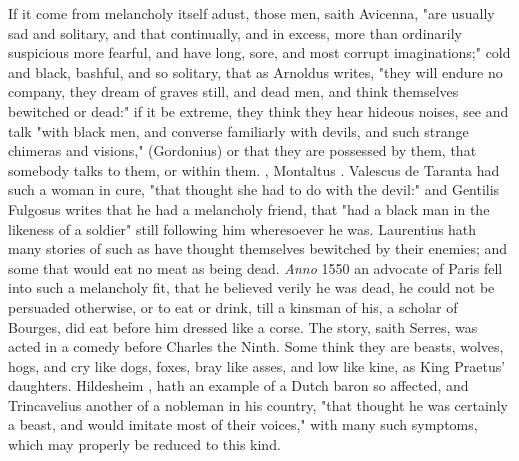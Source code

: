 {If it come from melancholy itself adust, those men, saith Avicenna,
"are usually sad and solitary, and that continually, and
in excess, more than ordinarily suspicious more fearful, and have long, sore,
and most corrupt imaginations;" cold and black, bashful, and so solitary, that
as Arnoldus writes, "they will endure no company, they
dream of graves still, and dead men, and think themselves bewitched or dead:"
if it be extreme, they think they hear hideous noises, see and talk
"with black men, and converse familiarly with devils, and
such strange chimeras and visions," (Gordonius) or that they are possessed by
them, that somebody talks to them, or within them. , Montaltus . Valescus de Taranta had such a woman in cure,
"that thought she had to do with the devil:" and Gentilis
Fulgosus  writes that he had a melancholy
friend, that "had a black man in the likeness of a
soldier" still following him wheresoever he was. Laurentius
 hath many stories of such as have thought
themselves bewitched by their enemies; and some that would eat no meat as being
dead. \emph{Anno} 1550 an advocate of Paris fell into such
a melancholy fit, that he believed verily he was dead, he could not be
persuaded otherwise, or to eat or drink, till a kinsman of his, a scholar of
Bourges, did eat before him dressed like a corse. The story, saith Serres, was
acted in a comedy before Charles the Ninth. Some think they are beasts, wolves,
hogs, and cry like dogs, foxes, bray like asses, and low like kine, as King
Praetus' daughters. Hildesheim
, hath an example of a Dutch baron so
affected, and Trincavelius  another
of a nobleman in his country, "that thought he was
certainly a beast, and would imitate most of their voices," with many such
symptoms, which may properly be reduced to this kind.

}
